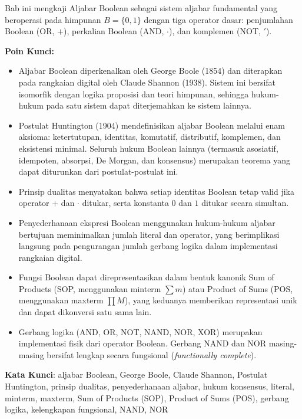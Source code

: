 \documentclass[../main]{subfiles}
\begin{document}

\begin{rangkuman}
Bab ini mengkaji Aljabar Boolean sebagai sistem aljabar fundamental yang beroperasi pada himpunan $B = \{0, 1\}$ dengan tiga operator dasar: penjumlahan Boolean (OR, $+$), perkalian Boolean (AND, $\cdot$), dan komplemen (NOT, $'$).

\textbf{Poin Kunci:}
\begin{itemize}
  \item Aljabar Boolean diperkenalkan oleh George Boole (1854) dan diterapkan pada rangkaian digital oleh Claude Shannon (1938). Sistem ini bersifat isomorfik dengan logika proposisi dan teori himpunan, sehingga hukum-hukum pada satu sistem dapat diterjemahkan ke sistem lainnya.
  \item Postulat Huntington (1904) mendefinisikan aljabar Boolean melalui enam aksioma: ketertutupan, identitas, komutatif, distributif, komplemen, dan eksistensi minimal. Seluruh hukum Boolean lainnya (termasuk asosiatif, idempoten, absorpsi, De Morgan, dan konsensus) merupakan teorema yang dapat diturunkan dari postulat-postulat ini.
  \item Prinsip dualitas menyatakan bahwa setiap identitas Boolean tetap valid jika operator $+$ dan $\cdot$ ditukar, serta konstanta $0$ dan $1$ ditukar secara simultan.
  \item Penyederhanaan ekspresi Boolean menggunakan hukum-hukum aljabar bertujuan meminimalkan jumlah literal dan operator, yang berimplikasi langsung pada pengurangan jumlah gerbang logika dalam implementasi rangkaian digital.
  \item Fungsi Boolean dapat direpresentasikan dalam bentuk kanonik Sum of Products (SOP, menggunakan minterm $\sum m$) atau Product of Sums (POS, menggunakan maxterm $\prod M$), yang keduanya memberikan representasi unik dan dapat dikonversi satu sama lain.
  \item Gerbang logika (AND, OR, NOT, NAND, NOR, XOR) merupakan implementasi fisik dari operator Boolean. Gerbang NAND dan NOR masing-masing bersifat lengkap secara fungsional (\textit{functionally complete}).
\end{itemize}

\textbf{Kata Kunci}: aljabar Boolean, George Boole, Claude Shannon, Postulat Huntington, prinsip dualitas, penyederhanaan aljabar, hukum konsensus, literal, minterm, maxterm, Sum of Products (SOP), Product of Sums (POS), gerbang logika, kelengkapan fungsional, NAND, NOR
\end{rangkuman}

\ifSubfilesClassLoaded{
  \renewcommand{\bibname}{Daftar Pustaka}
  
  
}{}
\end{document}
